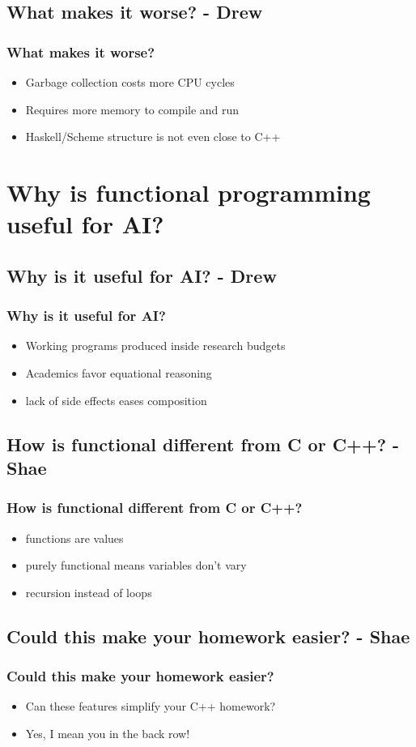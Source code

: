 \documentclass[xcolor=pdftex,dvipsnames,table]{beamer}
\begin{document}
\subsection{What makes it worse? - Drew}
\begin{frame}
  \frametitle{What makes it worse?}
  \begin{itemize}
  \item Garbage collection costs more CPU cycles
  \item Requires more memory to compile and run
  \item Haskell/Scheme structure is not even close to C++
  \end{itemize}
\end{frame}

\section{Why is functional programming useful for AI?}
\subsection{Why is it useful for AI? - Drew}
\begin{frame}
  \frametitle{Why is it useful for AI?}
  \begin{itemize}
  \item Working programs produced inside research budgets
  \item Academics favor equational reasoning
  \item lack of side effects eases composition
  \end{itemize}
\end{frame}

\subsection{How is functional different from C or C++? - Shae}
\begin{frame}
  \frametitle{How is functional different from C or C++?}
  \begin{itemize}
  \item functions are values
  \item purely functional means variables don't vary
  \item recursion instead of loops
  \end{itemize}
\end{frame}

\subsection{Could this make your homework easier? - Shae}
\begin{frame}
  \frametitle{Could this make your homework easier?}
  \begin{itemize}
  \item Can these features simplify your C++ homework?
  \item Yes, I mean you in the back row!
  \end{itemize}
\end{frame}
\end{document}

